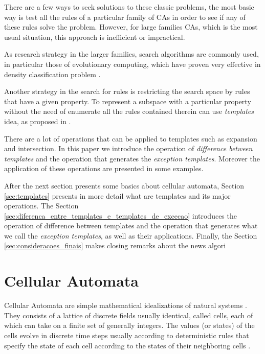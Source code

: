 \documentclass{llncs}
\begin{document}
There are a few ways to seek solutions to these classic problems, the most basic way is test all the rules of a particular family of CAs in order to see if any of these rules solve the problem. However, for large families CAs, which is the most usual situation, this approach is inefficient or impractical.

As research strategy in the larger families, search algorithms are commonly used, in particular those of evolutionary computing, which have proven very effective in density classification problem \cite{wolz2008very}.%

Another strategy in the search for rules is restricting the search space by rules that have a given property. To represent a subspace with a particular property without the need of enumerate all the rules contained therein can use \textit{templates} idea, as proposed in \cite{deOliveira2014,deOliveira2014b}.

There are a lot of operations that can be applied to templates such as expansion and intersection. In this paper we introduce the operation of \textit{difference between templates} and the operation that generates the \textit{exception templates}. Moreover the application of these operations are presented in some examples.

After the next section presents some basics about cellular automata, Section \ref{sec:templates} presents in more detail what are templates and its major operations. The Section \ref{sec:diferenca_entre_templates_e_templates_de_excecao} introduces the operation of difference between templates and the operation that generates what we call the \textit{exception templates}, as well as their applications. Finally, the Section \ref{sec:consideracoes_finais} makes closing remarks about the news algori

\section{Cellular Automata}
\label{sec:automatos_celulares}
Cellular Automata are simple mathematical idealizations of natural systems \cite{wolfram1994cellular}. They consists of a lattice of discrete fields usually identical, called cells, each of which can take on a finite set of generally integers. The values (or states) of the cells evolve in discrete time steps usually according to deterministic rules that specify the state of each cell according to the states of their neighboring cells \cite{wolfram1994cellular}.%
\end{document}

